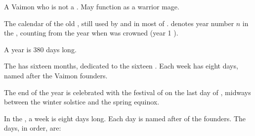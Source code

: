 \begin{gloss}
\begin{subgloss}
  
  
  
  
  \begin{comment}
  \subparagraph{\templar}
  \end{comment}
  \gitem[\templars]{\templar}
  A Vaimon who is not a \cleric. 
  May function as a warrior mage. 
\end{subgloss}








\begin{comment}
\paragraph{\VaimonCalendar}
\end{comment}
\gitem{\VaimonCalendar}
The calendar of the old , still used by  and in most of . 
 denotes year number $n$ in the \ImperialCalendar{}, counting from the year when  was crowned \caliph (year 1 \IC{}). 

A year is 380 days long. 

The \ImperialCalendar{} has sixteen months, dedicated to the sixteen . 
Each week has eight days, named after the Vaimon founders. 

The end of the year is celebrated with the festival of \Camaire{} on the last day of \Gamishiel{}, midways between the winter solstice and the spring equinox. 






\begin{subgloss}
  \begin{comment}
  \subparagraph{days}
  \end{comment}
  \index{\Corjin}
  \index{\Zetherab}
  \index{\Rebecab}
  \index{\Arcab}
  \index{\Norquin}
  \index{\Tirjin}
  \index{\Kerzab}
  \index{\Siljin}
  In the , a week is eight days long. 
  Each day is named after of the  founders.
  The days, in order, are:
  

\end{subgloss}
\end{gloss}
